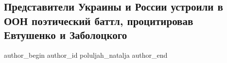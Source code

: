  
 
 
 
 
 
\subsection{Представители Украины и России устроили в ООН поэтический баттл, процитировав Евтушенко и Заболоцкого}
\label{sec:17_02_2022.stz.news.ua.strana.2.oon_battl_poezia_ukraina_rossia}
 
\ifcmt
 author_begin
   author_id poluljah_natalja
 author_end
\fi

